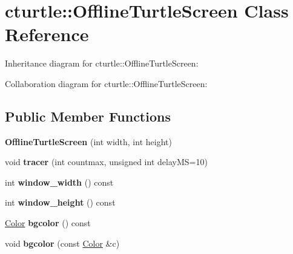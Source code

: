 \hypertarget{classcturtle_1_1OfflineTurtleScreen}{}\section{cturtle\+:\+:Offline\+Turtle\+Screen Class Reference}
\label{classcturtle_1_1OfflineTurtleScreen}


Inheritance diagram for cturtle\+:\+:Offline\+Turtle\+Screen\+:


Collaboration diagram for cturtle\+:\+:Offline\+Turtle\+Screen\+:
\subsection*{Public Member Functions}
\begin{DoxyCompactItemize}
\item 
\mbox{\label{classcturtle_1_1OfflineTurtleScreen_a8f53d0c340abebf7923bc10132f5a5e5}} 
{\bfseries Offline\+Turtle\+Screen} (int width, int height)
\item 
\mbox{\label{classcturtle_1_1OfflineTurtleScreen_a07a12e91a21ee5d1121846827488c750}} 
void {\bfseries tracer} (int countmax, unsigned int delay\+MS=10)
\item 
\mbox{\label{classcturtle_1_1OfflineTurtleScreen_a332517be91a395dbdf734227d4ca756a}} 
int {\bfseries window\+\_\+width} () const
\item 
\mbox{\label{classcturtle_1_1OfflineTurtleScreen_ae65b67d6790f5ff6d3992b2bede5c385}} 
int {\bfseries window\+\_\+height} () const
\item 
\mbox{\label{classcturtle_1_1OfflineTurtleScreen_aafe3bd4c4a841056cb31a690f02a4e35}} 
\hyperlink{classcturtle_1_1Color}{Color} {\bfseries bgcolor} () const
\item 
\mbox{\label{classcturtle_1_1OfflineTurtleScreen_a5ef2068a86cf95dda7e74b21d95fdd7e}} 
void {\bfseries bgcolor} (const \hyperlink{classcturtle_1_1Color}{Color} \&c)
\item 

\end{DoxyCompactItemize}
